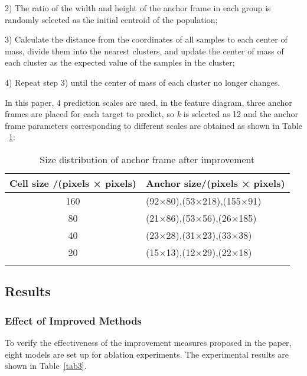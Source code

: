\documentclass[sn-mathphys,Numbered]{sn-jnl}%
\theoremstyle{thmstyleone}%
\theoremstyle{thmstyletwo}%
\theoremstyle{thmstylethree}%
\begin{document}
2) The ratio of the width and height of the anchor frame in each group is randomly selected as the initial centroid of the population;

3) Calculate the distance from the coordinates of all samples to each center of mass, divide them into the nearest clusters, and update the center of mass of each cluster as the expected value of the samples in the cluster;

4) Repeat step 3) until the center of mass of each cluster no longer changes.

In this paper, 4 prediction scales are used, in the feature diagram, three anchor frames are placed for each target to predict, so \emph{k} is selected as 12 and the anchor frame parameters corresponding to different scales are obtained as shown in Table ~\ref{tab2}:

\begin{table}[h]
\caption{Size distribution of anchor frame after improvement}\label{tab2}%
\begin{tabular}{@{}cl@{}}
\toprule
Cell size /(pixels × pixels)  & Anchor size/(pixels × pixels)\\
\midrule
                    160	& (92×80),(53×218),(155×91) \\
                    80	& (21×86),(53×56),(26×185)  \\
                    40	& (23×28),(31×23),(33×38)   \\
                    20	& (15×13),(12×29),(22×18)   \\
\botrule
\end{tabular}
\end{table}

\subsection {Results}\label{sec4}

\subsubsection {Effect of Improved Methods}\label {subsubsec2}

To verify the effectiveness of the improvement measures proposed in the paper, eight models are set up for ablation experiments. The experimental results are shown in  Table~\ref{tab3}.
\end{document}

